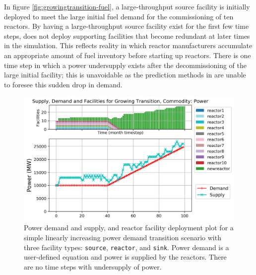 In figure \ref{fig:growingtransition-fuel},
a large-throughput source facility is initially
deployed to meet the large initial fuel demand for the commissioning 
of ten reactors. 
By having a large-throughput source facility exist for the 
first few time steps, \deploy does not deploy supporting
facilities that become redundant at later times in  
the simulation.
This reflects reality in which reactor manufacturers accumulate
an appropriate amount of fuel inventory before starting 
up reactors. 
There is one time step in which a power undersupply exists after the 
decommissioning of the large initial facility; 
this is unavoidable as the prediction methods in \deploy are 
unable to foresee this sudden drop in demand. 

\begin{figure}[]
    \centering
    \includegraphics[width=\linewidth]{figures/growingtransition-power.png} 
        \caption{Power demand and supply, and reactor facility deployment plot for  
        a simple linearly increasing power demand transition scenario with 
        three facility types: \texttt{source}, \texttt{reactor}, and \texttt{sink}.
        Power demand is a user-defined equation and power is supplied by the reactors.
        There are no time steps with undersupply of power.}
        \label{fig:growingtransition-power}
\end{figure}

